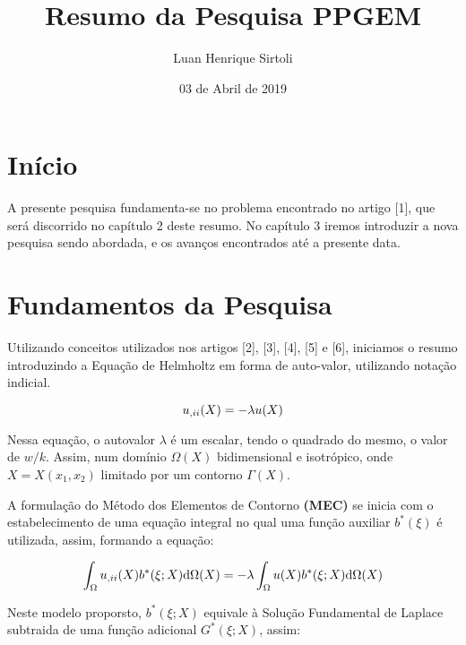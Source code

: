 \documentclass[a4paper,12p]{article}
\newcommand{\dd}[1]{\mathrm{d}#1}
\begin{document}
	
	\title{\LARGE{\textbf{Resumo da Pesquisa PPGEM}}}
	\author{Luan Henrique Sirtoli}
	\date{03 de Abril de 2019}
	\maketitle
	
	
	\setcounter{page}{1}

	\section{Início}
	A presente pesquisa fundamenta-se no problema encontrado no artigo [1], que será discorrido no capítulo 2 deste resumo. No capítulo 3 iremos introduzir a nova pesquisa sendo abordada, e os avanços encontrados até a presente data.
	
	
	\section{Fundamentos da Pesquisa}
	Utilizando conceitos utilizados nos artigos [2], [3], [4], [5] e [6], iniciamos o resumo introduzindo a Equação de Helmholtz em forma de auto-valor, utilizando notação indicial.
	
	\begin{equation}
	u_{,ii}(X) = -\lambda \mathnormal{u(X)}
	\end{equation}

	Nessa equação, o autovalor $\lambda$ é um escalar, tendo o quadrado do mesmo, o valor de $w/k$. Assim, num domínio $\Omega(X)$ bidimensional e isotrópico, onde $X=X(x_{1},x_{2})$ limitado por um contorno $\Gamma(X)$.
	
	A formulação do Método dos Elementos de Contorno \textbf{(MEC)} se inicia com o estabelecimento de uma equação integral no qual uma função auxiliar $b^{*}(\xi)$ é utilizada, assim, formando a equação:
	
	\begin{equation}
	\int_{\Omega}^{} u_{,ii}(X) b^{*}(\xi;X) \dd{\Omega(X)} = -\lambda \int_{\Omega}^{} \mathnormal{u(X)} b^{*}(\xi;X) \dd{\Omega(X)}
	\end{equation}
	
	Neste modelo proporsto, $b^{*}(\xi;X)$ equivale à Solução Fundamental de Laplace subtraida de uma função adicional $G^{*}(\xi;X)$, assim:
	
\end{document}
